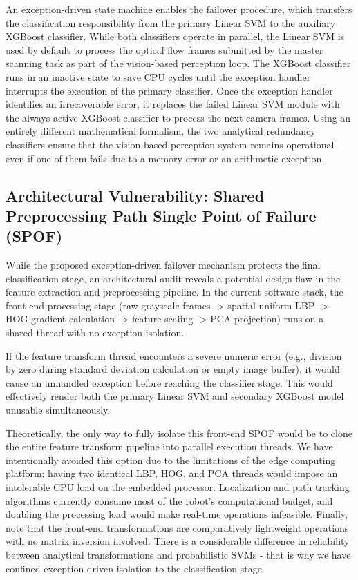 An exception-driven state machine enables the failover procedure, which transfers the classification responsibility from the primary Linear SVM to the auxiliary XGBoost classifier. While both classifiers operate in parallel, the Linear SVM is used by default to process the optical flow frames submitted by the master scanning task as part of the vision-based perception loop. The XGBoost classifier runs in an inactive state to save CPU cycles until the exception handler interrupts the execution of the primary classifier. Once the exception handler identifies an irrecoverable error, it replaces the failed Linear SVM module with the always-active XGBoost classifier to process the next camera frames. Using an entirely different mathematical formalism, the two analytical redundancy classifiers ensure that the vision-based perception system remains operational even if one of them fails due to a memory error or an arithmetic exception.

\subsection{Architectural Vulnerability: Shared Preprocessing Path Single Point of Failure (SPOF)}

While the proposed exception-driven failover mechanism protects the final classification stage, an architectural audit reveals a potential design flaw in the feature extraction and preprocessing pipeline. In the current software stack, the front-end processing stage (raw grayscale frames -> spatial uniform LBP -> HOG gradient calculation -> feature scaling -> PCA projection) runs on a shared thread with no exception isolation.

If the feature transform thread encounters a severe numeric error (e.g., division by zero during standard deviation calculation or empty image buffer), it would cause an unhandled exception before reaching the classifier stage. This would effectively render both the primary Linear SVM and secondary XGBoost model unusable simultaneously.

Theoretically, the only way to fully isolate this front-end SPOF would be to clone the entire feature transform pipeline into parallel execution threads. We have intentionally avoided this option due to the limitations of the edge computing platform: having two identical LBP, HOG, and PCA threads would impose an intolerable CPU load on the embedded processor. Localization and path tracking algorithms currently consume most of the robot's computational budget, and doubling the processing load would make real-time operations infeasible. Finally, note that the front-end transformations are comparatively lightweight operations with no matrix inversion involved. There is a considerable difference in reliability between analytical transformations and probabilistic SVMs - that is why we have confined exception-driven isolation to the classification stage.

